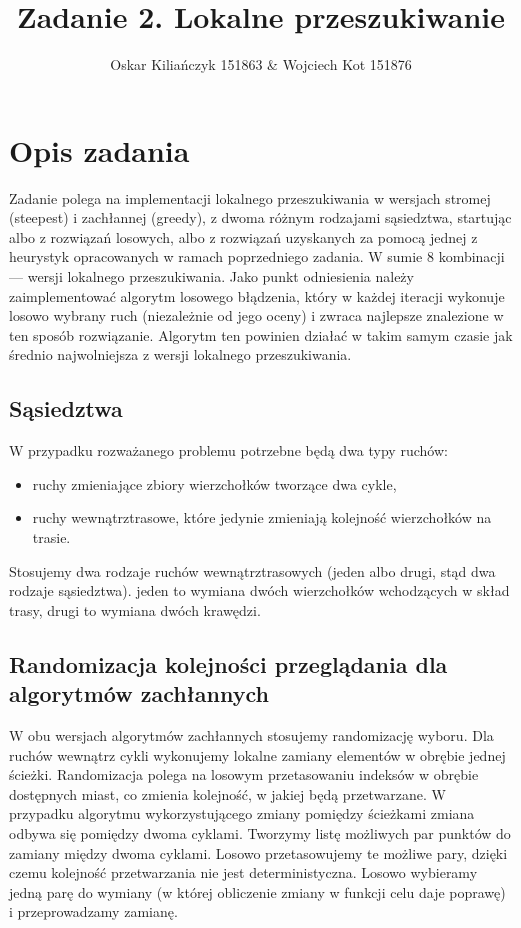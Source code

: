 \documentclass[11pt]{article}
\title{Zadanie 2. Lokalne przeszukiwanie}
\author{Oskar Kiliańczyk 151863 \& Wojciech Kot 151876}
\date{}
\begin{document}
\maketitle
\newpage

\section{Opis zadania}\label{sec:opis-zadania}
Zadanie polega na implementacji lokalnego przeszukiwania w wersjach stromej (steepest) i zachłannej (greedy), z dwoma różnym rodzajami sąsiedztwa, startując albo z rozwiązań losowych, albo z rozwiązań uzyskanych za pomocą jednej z heurystyk opracowanych w ramach poprzedniego zadania. W sumie 8 kombinacji --- wersji lokalnego przeszukiwania. Jako punkt odniesienia należy zaimplementować algorytm losowego błądzenia, który w każdej iteracji wykonuje losowo wybrany ruch (niezależnie od jego oceny) i zwraca najlepsze znalezione w ten sposób rozwiązanie. Algorytm ten powinien działać w takim samym czasie jak średnio najwolniejsza z wersji lokalnego przeszukiwania.

\subsection{Sąsiedztwa}
W przypadku rozważanego problemu potrzebne będą dwa typy ruchów:
\begin{itemize}
\item ruchy zmieniające zbiory wierzchołków tworzące dwa cykle,
\item ruchy wewnątrztrasowe, które jedynie zmieniają kolejność wierzchołków na trasie.
\end{itemize}
Stosujemy dwa rodzaje ruchów wewnątrztrasowych (jeden albo drugi, stąd dwa rodzaje sąsiedztwa). jeden to wymiana dwóch wierzchołków wchodzących w skład trasy, drugi to wymiana dwóch krawędzi.

\subsection{Randomizacja kolejności przeglądania dla algorytmów zachłannych}
W obu wersjach algorytmów zachłannych stosujemy randomizację wyboru. Dla ruchów wewnątrz cykli wykonujemy lokalne zamiany elementów w obrębie jednej ścieżki. Randomizacja polega na losowym przetasowaniu indeksów w obrębie dostępnych miast, co zmienia kolejność, w jakiej będą przetwarzane. W przypadku algorytmu wykorzystującego zmiany pomiędzy ścieżkami zmiana odbywa się pomiędzy dwoma cyklami. Tworzymy listę możliwych par punktów do zamiany między dwoma cyklami. Losowo przetasowujemy te możliwe pary, dzięki czemu kolejność przetwarzania nie jest deterministyczna. Losowo wybieramy jedną parę do wymiany (w której obliczenie zmiany w funkcji celu daje poprawę) i przeprowadzamy zamianę.
\end{document}
